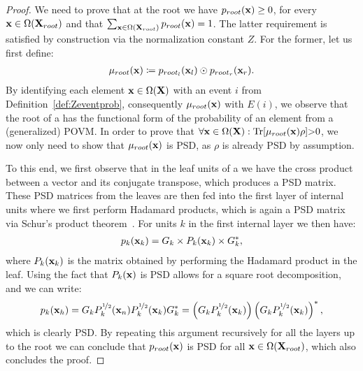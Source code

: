 \begin{proof}
	We need to prove that at the root we have $p_{root}(\mathbf{x})\geq 0$, for every $\mathbf{x} \in \Omega(\mathbf{X}_{root})$ and that $\sum_{\mathbf{x} \in \Omega(\mathbf{X}_{root})} p_{root}(\mathbf{x})=1$.
	The latter requirement is satisfied by construction via the normalization constant $Z$. For the former, let us first define:
	\begin{align}
		\mu_{root}(\mathbf{x}) \coloneqq p_{root_l}(\mathbf{x}_{l}) \odot  p_{root_r}(\mathbf{x}_{r}).
	\end{align}
	By identifying each element $\mathbf{x} \in \Omega(\mathbf{X})$ with an event $i$ from Definition~\ref{def:Zeventprob}, consequently $\mu_{root}(\mathbf{x})$ with $E(i)$, we observe that the root of a \poc has the functional form of the probability of an element from a (generalized) POVM.
	In order to prove that $\forall \xvars \in \Omega(\Xvars): \Trace[\mu_{root}(\xvars) \rho]{>}0$,
	we now only need to show that $\mu_{root}(\mathbf{x})$ is PSD,
	as $\rho$ is already PSD by assumption.

	To this end, we first observe that in the leaf units of a \poc we have the cross product between a vector and its conjugate transpose, which produces a PSD matrix. These PSD matrices from the leaves are then fed into the first layer of internal units where we first perform Hadamard products, which is again a PSD matrix via Schur's product theorem~\citep[p. 14, Theorem VII]{schur1911bemerkungen}. For units $k$ in the first internal layer we then have:
	\begin{align}
		p_k(\mathbf{x}_k)
		=
		G_k \times P_k(\mathbf{x}_k) \times G_{k}^*,
	\end{align}
	where $P_k(\mathbf{x}_k)$ is the matrix obtained by performing the Hadamard product in the leaf. Using the fact that $P_k(\mathbf{x})$ is PSD allows for a square root decomposition, and we can write:
	\begin{align}
		p_k(\mathbf{x}_h) = G_k P^{\nicefrac{1}{2}}_k(\mathbf{x}_n) P^{\nicefrac{1}{2}}_k(\mathbf{x}_k) G_k^*
		=
		\left( G_k P^{\nicefrac{1}{2}}_k(\mathbf{x}_k) \right)
		\left( G_k P^{\nicefrac{1}{2}}_k(\mathbf{x}_k) \right)^*,
	\end{align}
	which is clearly PSD. By repeating this argument recursively for all the layers up to the root we can conclude that $p_{root}(\mathbf{x})$ is PSD for all $\mathbf{x} \in \Omega(\mathbf{X}_{root})$, which also concludes the proof.
\end{proof}




